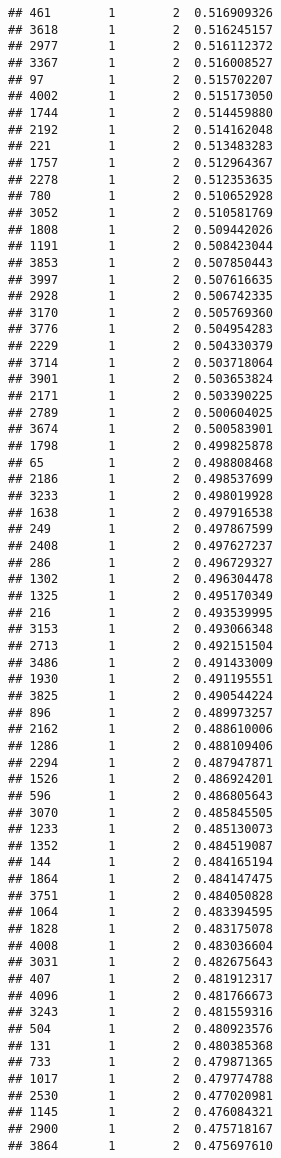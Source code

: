 \documentclass[
]{article}
\begin{document}
\begin{verbatim}
## 461        1        2  0.516909326
## 3618       1        2  0.516245157
## 2977       1        2  0.516112372
## 3367       1        2  0.516008527
## 97         1        2  0.515702207
## 4002       1        2  0.515173050
## 1744       1        2  0.514459880
## 2192       1        2  0.514162048
## 221        1        2  0.513483283
## 1757       1        2  0.512964367
## 2278       1        2  0.512353635
## 780        1        2  0.510652928
## 3052       1        2  0.510581769
## 1808       1        2  0.509442026
## 1191       1        2  0.508423044
## 3853       1        2  0.507850443
## 3997       1        2  0.507616635
## 2928       1        2  0.506742335
## 3170       1        2  0.505769360
## 3776       1        2  0.504954283
## 2229       1        2  0.504330379
## 3714       1        2  0.503718064
## 3901       1        2  0.503653824
## 2171       1        2  0.503390225
## 2789       1        2  0.500604025
## 3674       1        2  0.500583901
## 1798       1        2  0.499825878
## 65         1        2  0.498808468
## 2186       1        2  0.498537699
## 3233       1        2  0.498019928
## 1638       1        2  0.497916538
## 249        1        2  0.497867599
## 2408       1        2  0.497627237
## 286        1        2  0.496729327
## 1302       1        2  0.496304478
## 1325       1        2  0.495170349
## 216        1        2  0.493539995
## 3153       1        2  0.493066348
## 2713       1        2  0.492151504
## 3486       1        2  0.491433009
## 1930       1        2  0.491195551
## 3825       1        2  0.490544224
## 896        1        2  0.489973257
## 2162       1        2  0.488610006
## 1286       1        2  0.488109406
## 2294       1        2  0.487947871
## 1526       1        2  0.486924201
## 596        1        2  0.486805643
## 3070       1        2  0.485845505
## 1233       1        2  0.485130073
## 1352       1        2  0.484519087
## 144        1        2  0.484165194
## 1864       1        2  0.484147475
## 3751       1        2  0.484050828
## 1064       1        2  0.483394595
## 1828       1        2  0.483175078
## 4008       1        2  0.483036604
## 3031       1        2  0.482675643
## 407        1        2  0.481912317
## 4096       1        2  0.481766673
## 3243       1        2  0.481559316
## 504        1        2  0.480923576
## 131        1        2  0.480385368
## 733        1        2  0.479871365
## 1017       1        2  0.479774788
## 2530       1        2  0.477020981
## 1145       1        2  0.476084321
## 2900       1        2  0.475718167
## 3864       1        2  0.475697610

\end{verbatim}
\end{document}
